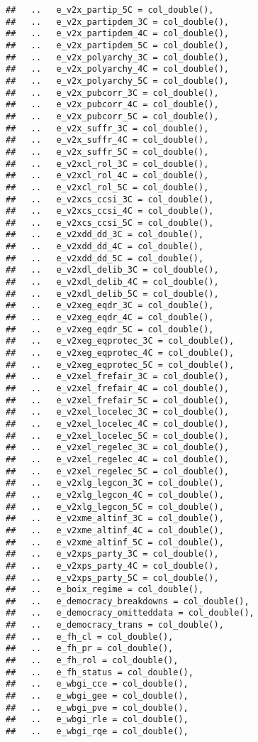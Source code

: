 \documentclass[
]{article}
\begin{document}
\begin{verbatim}
##   ..   e_v2x_partip_5C = col_double(),
##   ..   e_v2x_partipdem_3C = col_double(),
##   ..   e_v2x_partipdem_4C = col_double(),
##   ..   e_v2x_partipdem_5C = col_double(),
##   ..   e_v2x_polyarchy_3C = col_double(),
##   ..   e_v2x_polyarchy_4C = col_double(),
##   ..   e_v2x_polyarchy_5C = col_double(),
##   ..   e_v2x_pubcorr_3C = col_double(),
##   ..   e_v2x_pubcorr_4C = col_double(),
##   ..   e_v2x_pubcorr_5C = col_double(),
##   ..   e_v2x_suffr_3C = col_double(),
##   ..   e_v2x_suffr_4C = col_double(),
##   ..   e_v2x_suffr_5C = col_double(),
##   ..   e_v2xcl_rol_3C = col_double(),
##   ..   e_v2xcl_rol_4C = col_double(),
##   ..   e_v2xcl_rol_5C = col_double(),
##   ..   e_v2xcs_ccsi_3C = col_double(),
##   ..   e_v2xcs_ccsi_4C = col_double(),
##   ..   e_v2xcs_ccsi_5C = col_double(),
##   ..   e_v2xdd_dd_3C = col_double(),
##   ..   e_v2xdd_dd_4C = col_double(),
##   ..   e_v2xdd_dd_5C = col_double(),
##   ..   e_v2xdl_delib_3C = col_double(),
##   ..   e_v2xdl_delib_4C = col_double(),
##   ..   e_v2xdl_delib_5C = col_double(),
##   ..   e_v2xeg_eqdr_3C = col_double(),
##   ..   e_v2xeg_eqdr_4C = col_double(),
##   ..   e_v2xeg_eqdr_5C = col_double(),
##   ..   e_v2xeg_eqprotec_3C = col_double(),
##   ..   e_v2xeg_eqprotec_4C = col_double(),
##   ..   e_v2xeg_eqprotec_5C = col_double(),
##   ..   e_v2xel_frefair_3C = col_double(),
##   ..   e_v2xel_frefair_4C = col_double(),
##   ..   e_v2xel_frefair_5C = col_double(),
##   ..   e_v2xel_locelec_3C = col_double(),
##   ..   e_v2xel_locelec_4C = col_double(),
##   ..   e_v2xel_locelec_5C = col_double(),
##   ..   e_v2xel_regelec_3C = col_double(),
##   ..   e_v2xel_regelec_4C = col_double(),
##   ..   e_v2xel_regelec_5C = col_double(),
##   ..   e_v2xlg_legcon_3C = col_double(),
##   ..   e_v2xlg_legcon_4C = col_double(),
##   ..   e_v2xlg_legcon_5C = col_double(),
##   ..   e_v2xme_altinf_3C = col_double(),
##   ..   e_v2xme_altinf_4C = col_double(),
##   ..   e_v2xme_altinf_5C = col_double(),
##   ..   e_v2xps_party_3C = col_double(),
##   ..   e_v2xps_party_4C = col_double(),
##   ..   e_v2xps_party_5C = col_double(),
##   ..   e_boix_regime = col_double(),
##   ..   e_democracy_breakdowns = col_double(),
##   ..   e_democracy_omitteddata = col_double(),
##   ..   e_democracy_trans = col_double(),
##   ..   e_fh_cl = col_double(),
##   ..   e_fh_pr = col_double(),
##   ..   e_fh_rol = col_double(),
##   ..   e_fh_status = col_double(),
##   ..   e_wbgi_cce = col_double(),
##   ..   e_wbgi_gee = col_double(),
##   ..   e_wbgi_pve = col_double(),
##   ..   e_wbgi_rle = col_double(),
##   ..   e_wbgi_rqe = col_double(),

\end{verbatim}
\end{document}
